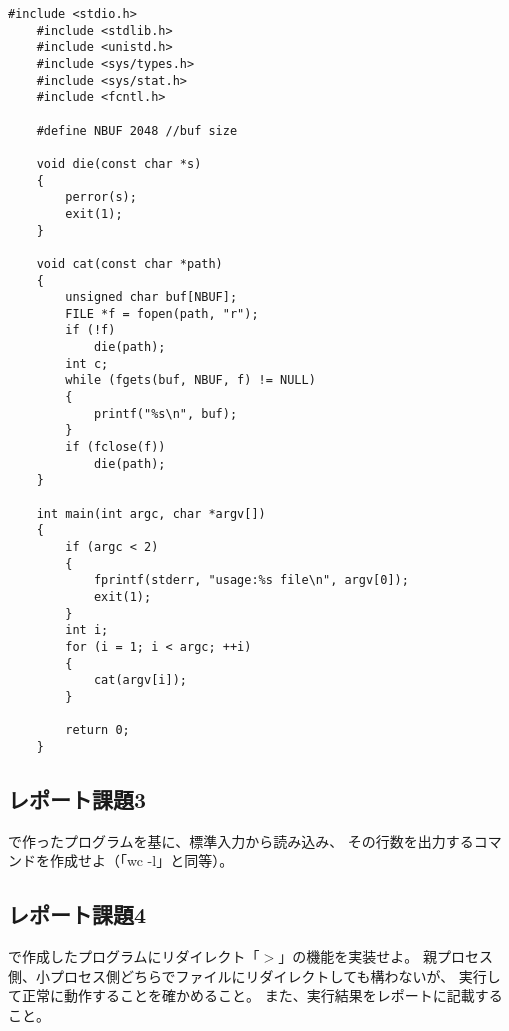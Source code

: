 \documentclass[12pt]{jarticle}
\begin{document}
\begin{itembox}[l]{}

\end{itembox}
\begin{lstlisting}[caption=read\_3\_fgets.c,label=read3, style=lstC]
    #include <stdio.h>
    #include <stdlib.h>
    #include <unistd.h>
    #include <sys/types.h>
    #include <sys/stat.h>
    #include <fcntl.h>
    
    #define NBUF 2048 //buf size
    
    void die(const char *s)
    {
        perror(s);
        exit(1);
    }
    
    void cat(const char *path)
    {
        unsigned char buf[NBUF];
        FILE *f = fopen(path, "r");
        if (!f)
            die(path);
        int c;
        while (fgets(buf, NBUF, f) != NULL)
        {
            printf("%s\n", buf);
        }
        if (fclose(f))
            die(path);
    }
    
    int main(int argc, char *argv[])
    {
        if (argc < 2)
        {
            fprintf(stderr, "usage:%s file\n", argv[0]);
            exit(1);
        }
        int i;
        for (i = 1; i < argc; ++i)
        {
            cat(argv[i]);
        }
    
        return 0;
    }
\end{lstlisting}
\begin{itembox}[l]{}

\end{itembox}


\subsection{レポート課題3}
\begin{shadebox}
    で作ったプログラムを基に、標準入力から読み込み、
    その行数を出力するコマンドを作成せよ（「wc -l」と同等）。
\end{shadebox}

\subsection{レポート課題4}
\begin{shadebox}
    で作成したプログラムにリダイレクト「$>$」の機能を実装せよ。
    親プロセス側、小プロセス側どちらでファイルにリダイレクトしても構わないが、
    実行して正常に動作することを確かめること。
    また、実行結果をレポートに記載すること。
\end{shadebox}
\end{document}
